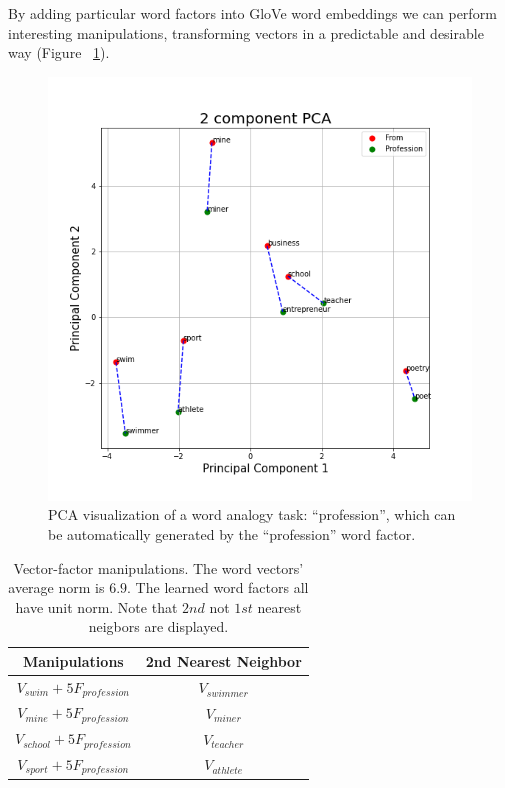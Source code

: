 \documentclass[10pt, a4paper, twocolumn]{article} %
\begin{document}
By adding particular word factors into GloVe word embeddings we can perform interesting manipulations, transforming vectors in a predictable and desirable way (Figure ~\ref{fig:manip}). 

\begin{figure}
	\includegraphics[width=\linewidth]{pca_profession.png} %
	\caption{PCA visualization of a word analogy
task: “profession”, which can be automatically generated
by the “profession” word factor.} %
	\label{fig:pca} %
\end{figure}

\begin{table}
	\caption{Vector-factor manipulations. The word vectors’ average norm is $6.9$. The learned word factors all have unit norm. Note that $2nd$ not $1st$ nearest neigbors are displayed.}
	\centering
    \begin{tabular}{|c|c|}	
    \hline
    \textbf{Manipulations} & \textbf{2nd Nearest Neighbor} \\ \hline
    $V_{swim} + 5F_{profession}$ & $V_{swimmer}$ \\ \hline
	$V_{mine} + 5F_{profession}$ & $V_{miner}$ \\ \hline
	$V_{school} + 5F_{profession}$ & $V_{teacher}$ \\ \hline
	$V_{sport} + 5F_{profession}$ & $V_{athlete}$ \\ \hline
    \end{tabular}
    \label{fig:manip}
\end{table}
\end{document}
